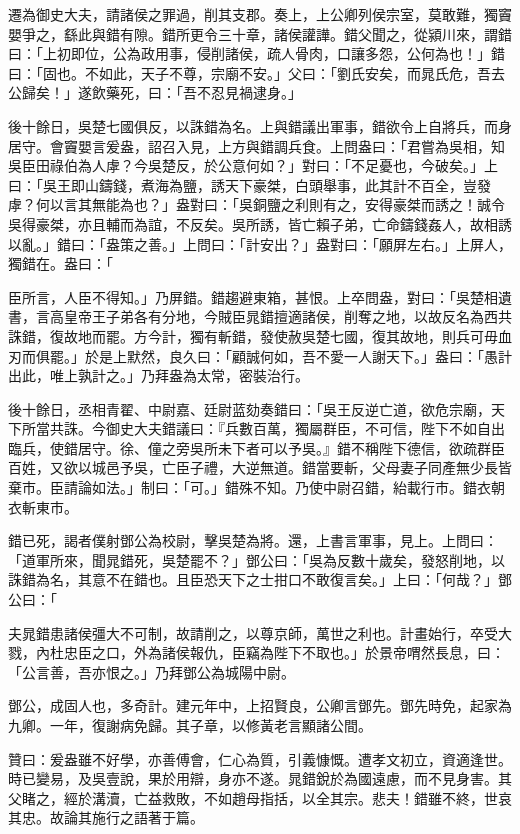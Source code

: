 \begin{pinyinscope}
遷為御史大夫，請諸侯之罪過，削其支郡。奏上，上公卿列侯宗室，莫敢難，獨竇嬰爭之，繇此與錯有隙。錯所更令三十章，諸侯讙譁。錯父聞之，從潁川來，謂錯曰：「上初即位，公為政用事，侵削諸侯，疏人骨肉，口讓多怨，公何為也！」錯曰：「固也。不如此，天子不尊，宗廟不安。」父曰：「劉氏安矣，而晁氏危，吾去公歸矣！」遂飲藥死，曰：「吾不忍見禍逮身。」

後十餘日，吳楚七國俱反，以誅錯為名。上與錯議出軍事，錯欲令上自將兵，而身居守。會竇嬰言爰盎，詔召入見，上方與錯調兵食。上問盎曰：「君嘗為吳相，知吳臣田祿伯為人虖？今吳楚反，於公意何如？」對曰：「不足憂也，今破矣。」上曰：「吳王即山鑄錢，煮海為鹽，誘天下豪桀，白頭舉事，此其計不百全，豈發虖？何以言其無能為也？」盎對曰：「吳銅鹽之利則有之，安得豪桀而誘之！誠令吳得豪桀，亦且輔而為誼，不反矣。吳所誘，皆亡賴子弟，亡命鑄錢姦人，故相誘以亂。」錯曰：「盎策之善。」上問曰：「計安出？」盎對曰：「願屏左右。」上屏人，獨錯在。盎曰：「

臣所言，人臣不得知。」乃屏錯。錯趨避東箱，甚恨。上卒問盎，對曰：「吳楚相遺書，言高皇帝王子弟各有分地，今賊臣晁錯擅適諸侯，削奪之地，以故反名為西共誅錯，復故地而罷。方今計，獨有斬錯，發使赦吳楚七國，復其故地，則兵可毋血刃而俱罷。」於是上默然，良久曰：「顧誠何如，吾不愛一人謝天下。」盎曰：「愚計出此，唯上孰計之。」乃拜盎為太常，密裝治行。

後十餘日，丞相青翟、中尉嘉、廷尉蓝劾奏錯曰：「吳王反逆亡道，欲危宗廟，天下所當共誅。今御史大夫錯議曰：『兵數百萬，獨屬群臣，不可信，陛下不如自出臨兵，使錯居守。徐、僮之旁吳所未下者可以予吳。』錯不稱陛下德信，欲疏群臣百姓，又欲以城邑予吳，亡臣子禮，大逆無道。錯當要斬，父母妻子同產無少長皆棄巿。臣請論如法。」制曰：「可。」錯殊不知。乃使中尉召錯，紿載行巿。錯衣朝衣斬東巿。

錯已死，謁者僕射鄧公為校尉，擊吳楚為將。還，上書言軍事，見上。上問曰：「道軍所來，聞晁錯死，吳楚罷不？」鄧公曰：「吳為反數十歲矣，發怒削地，以誅錯為名，其意不在錯也。且臣恐天下之士拑口不敢復言矣。」上曰：「何哉？」鄧公曰：「

夫晁錯患諸侯彊大不可制，故請削之，以尊京師，萬世之利也。計畫始行，卒受大戮，內杜忠臣之口，外為諸侯報仇，臣竊為陛下不取也。」於景帝喟然長息，曰：「公言善，吾亦恨之。」乃拜鄧公為城陽中尉。

鄧公，成固人也，多奇計。建元年中，上招賢良，公卿言鄧先。鄧先時免，起家為九卿。一年，復謝病免歸。其子章，以修黃老言顯諸公間。

贊曰：爰盎雖不好學，亦善傅會，仁心為質，引義慷慨。遭孝文初立，資適逢世。時已變易，及吳壹說，果於用辯，身亦不遂。晁錯銳於為國遠慮，而不見身害。其父睹之，經於溝瀆，亡益救敗，不如趙母指括，以全其宗。悲夫！錯雖不終，世哀其忠。故論其施行之語著于篇。


\end{pinyinscope}